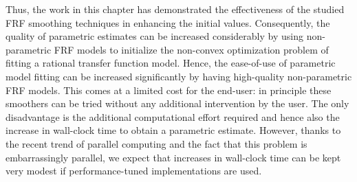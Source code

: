 Thus, the work in this chapter has demonstrated the effectiveness of the studied \gls{FRF} smoothing techniques in enhancing the initial values.
Consequently, the quality of parametric estimates can be increased considerably by using non-parametric \gls{FRF} models to initialize the non-convex optimization problem of fitting a rational transfer function model.
Hence, the ease-of-use of parametric model fitting can be increased significantly by having high-quality non-parametric \gls{FRF} models.
This comes at a limited cost for the end-user: in principle these smoothers can be tried without any additional intervention by the user.
The only disadvantage is the additional computational effort required and hence also the increase in wall-clock time to obtain a parametric estimate.
However, thanks to the recent trend of parallel computing and the fact that this problem is embarrassingly parallel, we expect that increases in wall-clock time can be kept very modest if performance-tuned implementations are used.
